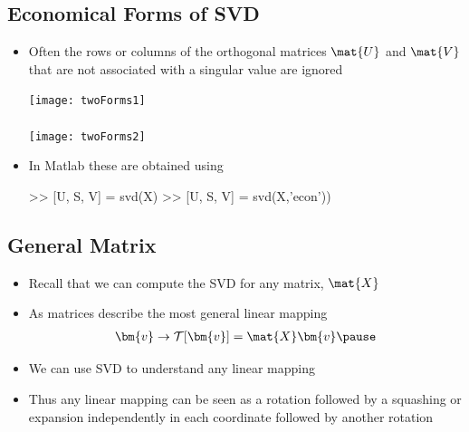 
\begin{slide}
\section[-2.5]{Economical Forms of SVD}

\begin{PauseHighLight}
  \begin{itemize}
  \item Often the rows or columns of the orthogonal matrices $\mat{U}$
    and $\mat{V}$ that are not associated with a singular value are
    ignored\pause
    \begin{center}
      \texttt{[image: twoForms1]}\\
      \ \\
      \texttt{[image: twoForms2]}
    \end{center}
  \item In Matlab these are obtained using
\begin{matlab}
  >> [U, S, V] = svd(X)
  >> [U, S, V] = svd(X,'econ'))
\end{matlab}\pause
  \end{itemize}
\end{PauseHighLight}

\end{slide}

\Outline %

\begin{slide}
\section{General Matrix}

\begin{PauseHighLight}
  \begin{itemize}
  \item Recall that we can compute the SVD for any matrix,
    $\mat{X}$\pause
  \item As matrices describe the most general linear mapping
    \begin{align*}
      \bm{v} \rightarrow \mathcal{T}[\bm{v}] = \mat{X}\bm{v}\pause
    \end{align*}
  \item We can use SVD to understand any linear mapping\pause
  \item Thus any linear mapping can be seen as a rotation followed by a
    squashing or expansion independently in each coordinate followed by
    another rotation\pause 
  \end{itemize}
\end{PauseHighLight}

\end{slide}

